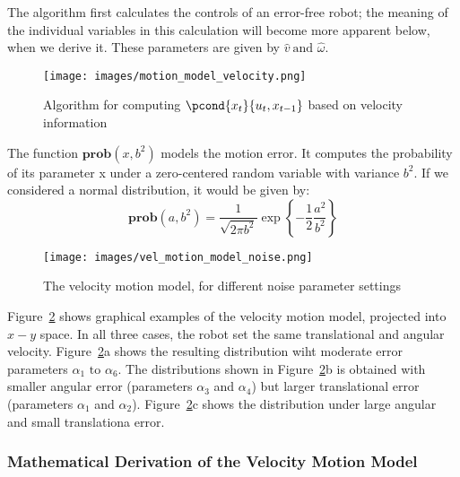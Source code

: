 The algorithm first calculates the controls of an error-free robot; the meaning of the individual variables in this calculation will become
more apparent below, when we derive it. These parameters are given by $\hat{v} \ \text{and } \hat{\omega}$.

\begin{figure}[H]
  \begin{center}
    \texttt{[image: images/motion\_model\_velocity.png]}
  \end{center}
  \caption{Algorithm for computing $\pcond{x_t}{u_t,x_{t-1}}$ based on velocity information} \label{fig:motion_model_velocity}
\end{figure}

The function $\mathbf{prob}(x,b^2)$ models the motion error. It computes the probability of its parameter x under a zero-centered random variable with variance $b^2$.
If we considered a normal distribution, it would be given by:
\begin{equation}
  \mathbf{prob}(a, b^2) = \frac{1}{\sqrt{2 \pi b^2}} \exp \left\{-\frac{1}{2} \frac{a^2}{b^2} \right\}
  \label{eq:prob normal distribution}
\end{equation}
\begin{figure}[H]
  \begin{center}
    \texttt{[image: images/vel\_motion\_model\_noise.png]}
  \end{center}
  \caption{The velocity motion model, for different noise parameter settings}\label{fig:vel_motion_model_noise}
\end{figure}

Figure~\ref{fig:vel_motion_model_noise} shows graphical examples of the velocity motion model, projected into $x-y$ space. In all three cases, the robot set the same translational and angular velocity.
Figure~\ref{fig:vel_motion_model_noise}a shows the resulting distribution wiht moderate error parameters $\alpha_1 \text{ to } \alpha_6$. The distributions shown in Figure~\ref{fig:vel_motion_model_noise}b is obtained with smaller angular error (parameters $\alpha_3$ and $\alpha_4$) but larger translational error (parameters $\alpha_1$ and $\alpha_2$).
Figure~\ref{fig:vel_motion_model_noise}c shows the distribution under large angular and small translationa error.

\subsubsection{Mathematical Derivation of the Velocity Motion Model}

